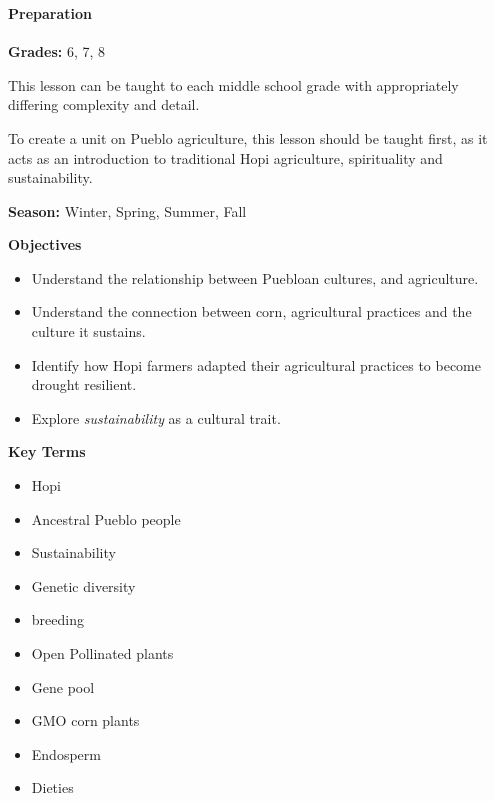 \documentclass[12pt,]{article}
\providecommand{\tightlist}{%
  \setlength{\itemsep}{0pt}\setlength{\parskip}{0pt}}
\let\oldparagraph\paragraph
\renewcommand{\paragraph}[1]{\oldparagraph{#1}\mbox{}}
\begin{document}
\hypertarget{section}{%
\subsubsection*{}\label{section}}

\hypertarget{preparation}{%
\paragraph{Preparation}\label{preparation}}

\textbf{Grades:} 6, 7, 8

This lesson can be taught to each middle school grade with appropriately differing
complexity and detail.

To create a unit on Pueblo agriculture, this lesson should be taught
first, as it acts as an introduction to traditional Hopi agriculture,
spirituality and sustainability.

\textbf{Season:} Winter, Spring, Summer, Fall

\textbf{Objectives}

\begin{itemize}
\tightlist
\item
  Understand the relationship between Puebloan cultures, and
  agriculture.
\item
  Understand the connection between corn, agricultural practices and
  the culture it sustains.
\item
  Identify how Hopi farmers adapted their agricultural practices to
  become drought resilient.
\item
  Explore \emph{sustainability} as a cultural trait.
\end{itemize}

\textbf{Key Terms}

\begin{itemize}
\tightlist
\item
  Hopi
\item
  Ancestral Pueblo people
\item
  Sustainability
\item
  Genetic diversity
\item
  breeding
\item
  Open Pollinated plants
\item
  Gene pool
\item
  GMO corn plants
\item
  Endosperm
\item
  Dieties
\end{itemize}
\end{document}
